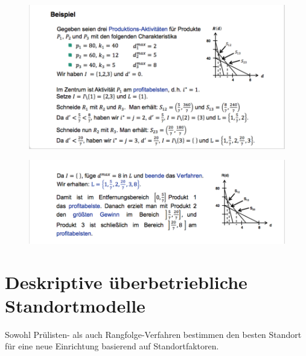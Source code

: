         \begin{figure}[htbp]
          \centering
          \includegraphics[width=\textwidth]{Images/Theorie_der_Boden_und_Flaechennutzung_BSP(1).png}
        \end{figure}

        \begin{figure}[htbp]
          \centering
          \includegraphics[width=\textwidth]{Images/Theorie_der_Boden_und_Flaechennutzung_BSP(2).png}
        \end{figure}

      \begin{exmp}
        \color{blue}{Aufgabe 3}
      \end{exmp}




  \section{Deskriptive überbetriebliche Standortmodelle} %
  \label{sec:deskriptive_berbetriebliche_standortmodelle}
  
    \par Sowohl Prülisten- als auch Rangfolge-Verfahren bestimmen den besten Standort für eine neue Einrichtung basierend auf Standortfaktoren.

